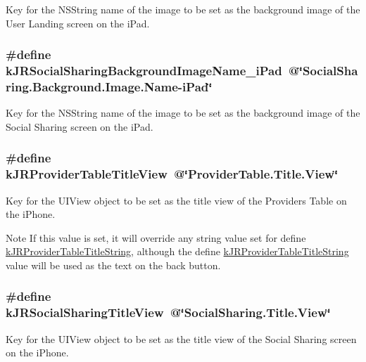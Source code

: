 Key for the {\ttfamily NSString} name of the image to be set as the background image of the User Landing screen on the iPad. \hypertarget{group__custom_interface_ga646cb35f3a7ec2835872ee6df2aceb76}{
\subsubsection[{kJRSocialSharingBackgroundImageName\_\-iPad}]{\setlength{\rightskip}{0pt plus 5cm}\#define kJRSocialSharingBackgroundImageName\_\-iPad~@\char`\"{}SocialSharing.Background.Image.Name-\/iPad\char`\"{}}}
\label{group__custom_interface_ga646cb35f3a7ec2835872ee6df2aceb76}
Key for the {\ttfamily NSString} name of the image to be set as the background image of the Social Sharing screen on the iPad. \hypertarget{group__custom_interface_ga0bce97edf43c9cdf53cbcd1aa92c4798}{
\subsubsection[{kJRProviderTableTitleView}]{\setlength{\rightskip}{0pt plus 5cm}\#define kJRProviderTableTitleView~@\char`\"{}ProviderTable.Title.View\char`\"{}}}
\label{group__custom_interface_ga0bce97edf43c9cdf53cbcd1aa92c4798}
Key for the {\ttfamily UIView} object to be set as the title view of the Providers Table on the iPhone.

\begin{DoxyNote}{Note}
If this value is set, it will override any string value set for define \hyperlink{group__custom_interface_gaf728e45125be9ca6fa515a39a77e7ce7}{kJRProviderTableTitleString}, although the define \hyperlink{group__custom_interface_gaf728e45125be9ca6fa515a39a77e7ce7}{kJRProviderTableTitleString} value will be used as the text on the back button. 
\end{DoxyNote}
\hypertarget{group__custom_interface_ga524965cf426f0eb9de4bcb804528c7f7}{
\subsubsection[{kJRSocialSharingTitleView}]{\setlength{\rightskip}{0pt plus 5cm}\#define kJRSocialSharingTitleView~@\char`\"{}SocialSharing.Title.View\char`\"{}}}
\label{group__custom_interface_ga524965cf426f0eb9de4bcb804528c7f7}
Key for the {\ttfamily UIView} object to be set as the title view of the Social Sharing screen on the iPhone.

